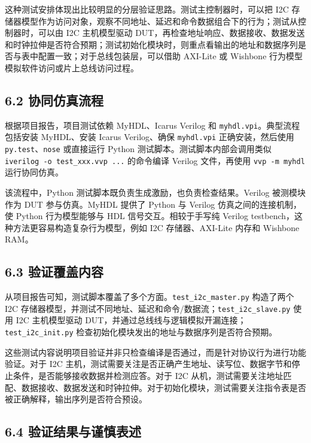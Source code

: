这种测试安排体现出比较明显的分层验证思路。测试主控制器时，可以把 I2C 存储器模型作为访问对象，观察不同地址、延迟和命令数据组合下的行为；测试从控制器时，可以由 I2C 主机模型驱动 DUT，再检查地址响应、数据接收、数据发送和时钟拉伸是否符合预期；测试初始化模块时，则重点看输出的地址和数据序列是否与表中配置一致；对于总线包装层，可以借助 AXI-Lite 或 Wishbone 行为模型模拟软件访问或片上总线访问过程。

\subsection{6.2 协同仿真流程}\label{ux534fux540cux4effux771fux6d41ux7a0b}

根据项目报告，项目测试依赖 MyHDL、Icarus Verilog 和 \texttt{myhdl.vpi}。典型流程包括安装 MyHDL、安装 Icarus Verilog、确保 \texttt{myhdl.vpi} 正确安装，然后使用 \texttt{py.test}、\texttt{nose} 或直接运行 Python 测试脚本。测试脚本内部会调用类似 \texttt{iverilog\ -o\ test\_xxx.vvp\ ...} 的命令编译 Verilog 文件，再使用 \texttt{vvp\ -m\ myhdl} 运行协同仿真。

该流程中，Python 测试脚本既负责生成激励，也负责检查结果。Verilog 被测模块作为 DUT 参与仿真。MyHDL 提供了 Python 与 Verilog 仿真之间的连接机制，使 Python 行为模型能够与 HDL 信号交互。相较于手写纯 Verilog testbench，这种方法更容易构造复杂行为模型，例如 I2C 存储器、AXI-Lite 内存和 Wishbone RAM。

\subsection{6.3 验证覆盖内容}\label{ux9a8cux8bc1ux8986ux76d6ux5185ux5bb9}

从项目报告可知，测试脚本覆盖了多个方面。\texttt{test\_i2c\_master.py} 构造了两个 I2C 存储器模型，并测试不同地址、延迟和命令/数据流；\texttt{test\_i2c\_slave.py} 使用 I2C 主机模型驱动 DUT，并通过总线线与逻辑模拟开漏连接；\texttt{test\_i2c\_init.py} 检查初始化模块发出的地址与数据序列是否符合预期。

这些测试内容说明项目验证并非只检查编译是否通过，而是针对协议行为进行功能验证。对于 I2C 主机，测试需要关注是否正确产生地址、读写位、数据字节和停止条件，是否能够接收数据并检测应答。对于 I2C 从机，测试需要关注地址匹配、数据接收、数据发送和时钟拉伸。对于初始化模块，测试需要关注指令表是否被正确解释，输出序列是否符合预设。

\subsection{6.4 验证结果与谨慎表述}\label{ux9a8cux8bc1ux7ed3ux679cux4e0eux8c28ux614eux8868ux8ff0}

